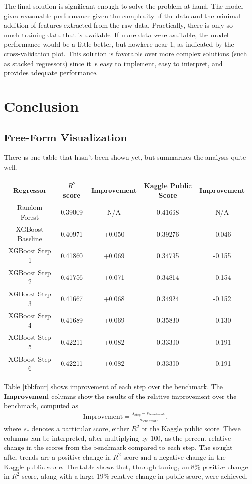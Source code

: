 \documentclass[12pt]{article}
\newcommand\beq{\begin{eqnarray*}}
\newcommand\eeq{\end{eqnarray*}}
\theoremstyle{plain} %
\theoremstyle{definition} %
\theoremstyle{remark} %
\begin{document}
The final solution is significant enough to solve the problem at hand.  The model gives reasonable performance given the complexity of the data and the minimal addition of features extracted from the raw data.  Practically, there is only so much training data that is available.  If more data were available, the model performance would be a little better, but nowhere near 1, as indicated by the cross-validation plot.  This solution is favorable over more complex solutions (such as stacked regressors) since it is easy to implement, easy to interpret, and provides adequate performance.

\section{Conclusion}

\subsection*{Free-Form Visualization}
\indent \par There is one table that hasn't been shown yet, but summarizes the analysis quite well.

\begin{center}
\begin{tabular}{c | c | c | c | c}
\hline
Regressor & $R^2$ score & Improvement & Kaggle Public Score & Improvement \\ \hline
Random Forest & 0.39009 & N/A &  0.41668 & N/A \\ \hline
XGBoost Baseline & 0.40971 & +0.050 &  0.39276 & -0.046 \\ \hline
XGBoost Step 1 & 0.41860 & +0.069 &  0.34795 & -0.155 \\ \hline
XGBoost Step 2 & 0.41756 & +0.071 &  0.34814 & -0.154 \\ \hline
XGBoost Step 3 & 0.41667 & +0.068 &  0.34924 & -0.152 \\ \hline
XGBoost Step 4 & 0.41689 & +0.069 &  0.35830 & -0.130 \\ \hline
XGBoost Step 5 & 0.42211 & +0.082 &  0.33300 & -0.191 \\ \hline
XGBoost Step 6 & 0.42211 & +0.082 &  0.33300 & -0.191 \\ \hline
\end{tabular}
\label{tbl:four}
\end{center}

Table \ref{tbl:four} shows improvement of each step over the benchmark.  The \textbf{Improvement} columns show the results of the relative improvement over the benchmark, computed as 
\beq
\text{Improvement} = \frac{s_{\text{step}} - s_{\text{benchmark}}}{s_{\text{benchmark}}}, 
\eeq
where $s_*$ denotes a particular score, either $R^2$ or the Kaggle public score.  These columns can be interpreted, after multiplying by 100, as the percent relative change in the scores from the benchmark compared to each step.  The sought after trends are a positive change in $R^2$ score and a negative change in the Kaggle public score.  The table shows that, through tuning, an 8\% positive change in $R^2$ score, along with a large 19\% relative change in public score, were achieved.
\end{document}
